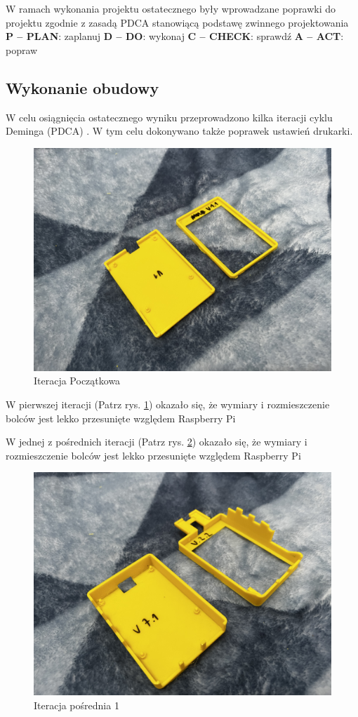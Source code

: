 \documentclass[a4paper,12pt,reqno]{article}
\begin{document}
W ramach wykonania projektu ostatecznego były wprowadzane poprawki do projektu zgodnie z zasadą PDCA stanowiącą podstawę zwinnego projektowania \newline
\textbf{P – PLAN}: zaplanuj \newline
\textbf{D – DO}: wykonaj \newline
\textbf{C – CHECK}: sprawdź \newline
\textbf{A – ACT}: popraw

\subsection{Wykonanie obudowy}
W celu osiągnięcia ostatecznego wyniku przeprowadzono kilka iteracji cyklu Deminga (PDCA) \cite{leanByJK}. W tym celu dokonywano także poprawek ustawień drukarki.

\begin{figure}[H]%
\centering
\includegraphics[width=0.8\columnwidth]{imgs/print_0.jpg}
\caption{Iteracja Początkowa \label{PDCA_00}}
\quad
\end{figure}

W pierwszej iteracji (Patrz rys. \ref{PDCA_00}) okazało się, że wymiary i rozmieszczenie bolców jest lekko przesunięte względem Raspberry Pi

\newpage
W jednej z pośrednich iteracji (Patrz rys. \ref{PDCA_01}) okazało się, że wymiary i rozmieszczenie bolców jest lekko przesunięte względem Raspberry Pi

\begin{figure}[H]%
\centering
\includegraphics[width=0.8\columnwidth]{imgs/print_1.jpg}
\caption{Iteracja pośrednia 1 \label{PDCA_01}}
\quad
\end{figure}
\end{document}
